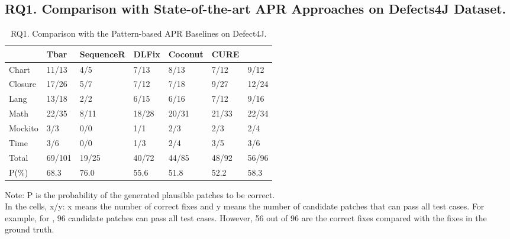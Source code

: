 \subsection{RQ1. Comparison with State-of-the-art APR Approaches on Defects4J Dataset.}

{\footnotesize{
		\begin{table}[h]
			\caption{RQ1. Comparison with the Pattern-based APR Baselines on Defect4J.}
			\begin{center}
				\renewcommand{\arraystretch}{1}
				\begin{tabular}{p{0.8cm}<{\centering}|p{0.6cm}<{\centering}|p{1.1cm}<{\centering}|p{0.8cm}<{\centering}|p{1cm}<{\centering}|p{0.6cm}<{\centering}|p{0.8cm}<{\centering}}
					
					\hline
					&\textbf{Tbar}&\textbf{SequenceR}&\textbf{DLFix}& \textbf{Coconut}&\textbf{CURE}&\textbf{\tool}\\
					\hline
					Chart  & 11/13  & 4/5   & 7/13  & 8/13  & 7/12   & 9/12\\
					Closure& 17/26  & 5/7   & 7/12  & 7/18  & 9/27   & 12/24\\
					Lang   & 13/18  & 2/2   & 6/15  & 6/16  & 7/12   & 9/16\\
					Math   & 22/35  & 8/11  & 18/28 & 20/31 & 21/33  & 22/34\\
					Mockito& 3/3    & 0/0   & 1/1   & 2/3   & 2/3    & 2/4\\
					Time   & 3/6    & 0/0   & 1/3   & 2/4   & 3/5    & 3/6\\
					\hline
					Total  & 69/101 & 19/25 & 40/72 & 44/85 & 48/92  & 56/96\\
					\hline
					P(\%)  & 68.3   & 76.0  & 55.6  & 51.8  & 52.2   & 58.3\\
					\hline
				\end{tabular}
				Note: P is the probability of the generated plausible patches to be correct.\\
				In the cells, x/y: x means the number of correct fixes and y means the number of candidate patches that can pass all test cases. For example, for \tool, 96 candidate patches can pass all test cases. However, 56 out of 96 are the correct fixes compared with the fixes in the ground truth.
				\label{RQ1_defect4j}
			\end{center}
		\end{table}
}}